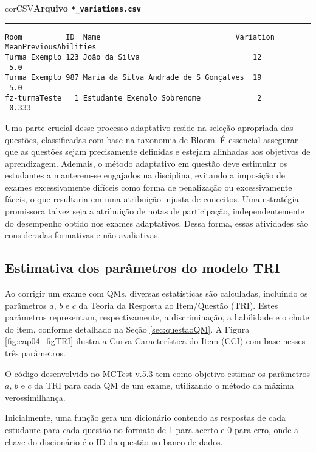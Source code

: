 \begin{myboxCode}{corCSV}{\textbf{Arquivo \texttt{*\_variations.csv}}}\vspace{3mm}
\hrule
\begin{verbatim}
Room          ID  Name                               Variation  MeanPreviousAbilities
Turma Exemplo 123 João da Silva                          12        -5.0
Turma Exemplo 987 Maria da Silva Andrade de S Gonçalves  19        -5.0
fz-turmaTeste   1 Estudante Exemplo Sobrenome             2        -0.333
\end{verbatim}
\end{myboxCode}


Uma parte crucial desse processo adaptativo reside na seleção apropriada das questões, classificadas com base na taxonomia de Bloom. É essencial assegurar que as questões sejam precisamente definidas e estejam alinhadas aos objetivos de aprendizagem. Ademais, o método adaptativo em questão deve estimular os estudantes a manterem-se engajados na disciplina, evitando a imposição de exames excessivamente difíceis como forma de penalização ou excessivamente fáceis, o que resultaria em uma atribuição injusta de conceitos. Uma estratégia promissora talvez seja a atribuição de notas de participação, independentemente do desempenho obtido nos exames adaptativos. Dessa forma, essas atividades são consideradas formativas e não avaliativas.

\subsection{Estimativa dos parâmetros do modelo TRI}

Ao corrigir um exame com QMs, diversas estatísticas são calculadas, incluindo os parâmetros $a$, $b$ e $c$ da Teoria da Resposta ao Item/Questão (TRI). Estes parâmetros representam, respectivamente, a discriminação, a habilidade e o chute do item, conforme detalhado na Seção \ref{sec:questaoQM}. A Figura \ref{fig:cap04_figTRI} ilustra a Curva Característica do Item (CCI) com base nesses três parâmetros.

O código desenvolvido no MCTest v.5.3 tem como objetivo estimar os parâmetros $a$, $b$ e $c$ da TRI para cada QM de um exame, utilizando o método da máxima verossimilhança.

Inicialmente, uma função gera um dicionário contendo as respostas de cada estudante para cada questão no formato de 1 para acerto e 0 para erro, onde a chave do discionário é o ID da questão no banco de dados.


